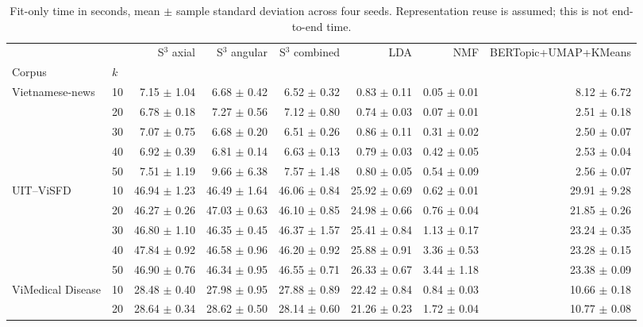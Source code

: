 \begin{table}[t]
\centering
\scriptsize
\caption{Fit-only time in seconds, mean $\pm$ sample standard deviation across four seeds. Representation reuse is assumed; this is not end-to-end time.}
\label{tab:cafebert-fit-time-sensitivity}
\begin{tabular}{llrrrrrr}
\toprule
 &  & S$^3$ axial & S$^3$ angular & S$^3$ combined & LDA & NMF & BERTopic+UMAP+KMeans \\
Corpus & $k$ &  &  &  &  &  &  \\
\midrule
\multirow[t]{5}{*}{Vietnamese-news} & 10 & 7.15 $\pm$ 1.04 & 6.68 $\pm$ 0.42 & 6.52 $\pm$ 0.32 & 0.83 $\pm$ 0.11 & 0.05 $\pm$ 0.01 & 8.12 $\pm$ 6.72 \\
 & 20 & 6.78 $\pm$ 0.18 & 7.27 $\pm$ 0.56 & 7.12 $\pm$ 0.80 & 0.74 $\pm$ 0.03 & 0.07 $\pm$ 0.01 & 2.51 $\pm$ 0.18 \\
 & 30 & 7.07 $\pm$ 0.75 & 6.68 $\pm$ 0.20 & 6.51 $\pm$ 0.26 & 0.86 $\pm$ 0.11 & 0.31 $\pm$ 0.02 & 2.50 $\pm$ 0.07 \\
 & 40 & 6.92 $\pm$ 0.39 & 6.81 $\pm$ 0.14 & 6.63 $\pm$ 0.13 & 0.79 $\pm$ 0.03 & 0.42 $\pm$ 0.05 & 2.53 $\pm$ 0.04 \\
 & 50 & 7.51 $\pm$ 1.19 & 9.66 $\pm$ 6.38 & 7.57 $\pm$ 1.48 & 0.80 $\pm$ 0.05 & 0.54 $\pm$ 0.09 & 2.56 $\pm$ 0.07 \\
\cline{1-8}
\multirow[t]{5}{*}{UIT--ViSFD} & 10 & 46.94 $\pm$ 1.23 & 46.49 $\pm$ 1.64 & 46.06 $\pm$ 0.84 & 25.92 $\pm$ 0.69 & 0.62 $\pm$ 0.01 & 29.91 $\pm$ 9.28 \\
 & 20 & 46.27 $\pm$ 0.26 & 47.03 $\pm$ 0.63 & 46.10 $\pm$ 0.85 & 24.98 $\pm$ 0.66 & 0.76 $\pm$ 0.04 & 21.85 $\pm$ 0.26 \\
 & 30 & 46.80 $\pm$ 1.10 & 46.35 $\pm$ 0.45 & 46.37 $\pm$ 1.57 & 25.41 $\pm$ 0.84 & 1.13 $\pm$ 0.17 & 23.24 $\pm$ 0.35 \\
 & 40 & 47.84 $\pm$ 0.92 & 46.58 $\pm$ 0.96 & 46.20 $\pm$ 0.92 & 25.88 $\pm$ 0.91 & 3.36 $\pm$ 0.53 & 23.28 $\pm$ 0.15 \\
 & 50 & 46.90 $\pm$ 0.76 & 46.34 $\pm$ 0.95 & 46.55 $\pm$ 0.71 & 26.33 $\pm$ 0.67 & 3.44 $\pm$ 1.18 & 23.38 $\pm$ 0.09 \\
\cline{1-8}
\multirow[t]{5}{*}{ViMedical Disease} & 10 & 28.48 $\pm$ 0.40 & 27.98 $\pm$ 0.95 & 27.88 $\pm$ 0.89 & 22.42 $\pm$ 0.84 & 0.84 $\pm$ 0.03 & 10.66 $\pm$ 0.18 \\
 & 20 & 28.64 $\pm$ 0.34 & 28.62 $\pm$ 0.50 & 28.14 $\pm$ 0.60 & 21.26 $\pm$ 0.23 & 1.72 $\pm$ 0.04 & 10.77 $\pm$ 0.08 \\

\end{tabular}
\end{table}
